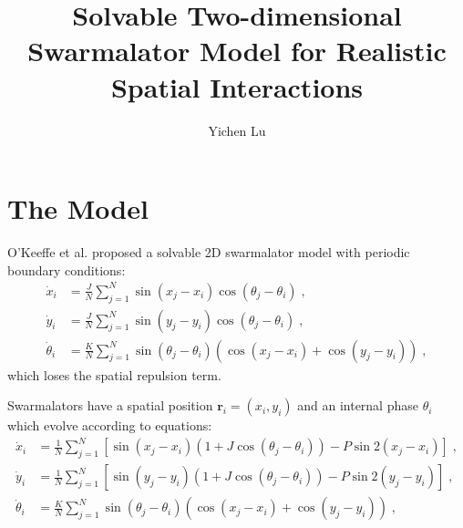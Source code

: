 \documentclass{article}
\title{\textbf{Solvable Two-dimensional Swarmalator Model for Realistic Spatial Interactions}}
\author{Yichen Lu}
\begin{document}
\maketitle

\tableofcontents

\newpage
\section{\label{sec:model}The Model}

O'Keeffe et al. proposed a solvable 2D swarmalator model with periodic boundary conditions:
\begin{subequations}
    \label{eq:totalDynamics}
    \begin{align}
        \dot{x}_i&=\frac{J}{N}\sum_{j=1}^N{\sin \left( x_j-x_i \right) \cos \left( \theta _j-\theta _i \right) \;,}\\
        \dot{y}_i&=\frac{J}{N}\sum_{j=1}^N{\sin \left( y_j-y_i \right) \cos \left( \theta _j-\theta _i \right) \;,}\\
        \dot{\theta}_i&=\frac{K}{N}\sum_{j=1}^N{\sin \left( \theta _j-\theta _i \right) \left( \cos \left( x_j-x_i \right) +\cos \left( y_j-y_i \right) \right) \;,}
    \end{align}
\end{subequations}
which loses the spatial repulsion term. 

Swarmalators have a spatial position $\mathbf{r}_i=\left( x_i, y_i \right)$ and an internal phase $\theta_i$ which evolve according to equations:
\begin{subequations}
    \label{eq:totalDynamics}
    \begin{align}
        \dot{x}_i&=\frac{1}{N}\sum_{j=1}^N{\left[ \sin \left( x_j-x_i \right) \left( 1+J\cos \left( \theta _j-\theta _i \right) \right) -P\sin 2\left( x_j-x_i \right) \right]}\;,\\
        \dot{y}_i&=\frac{1}{N}\sum_{j=1}^N{\left[ \sin \left( y_j-y_i \right) \left( 1+J\cos \left( \theta _j-\theta _i \right) \right) -P\sin 2\left( y_j-y_i \right) \right]}\;,\\
        \dot{\theta}_i&=\frac{K}{N}\sum_{j=1}^N{\sin \left( \theta _j-\theta _i \right) \left( \cos \left( x_j-x_i \right) +\cos \left( y_j-y_i \right) \right)}\;,
    \end{align}
\end{subequations}
\end{document}
